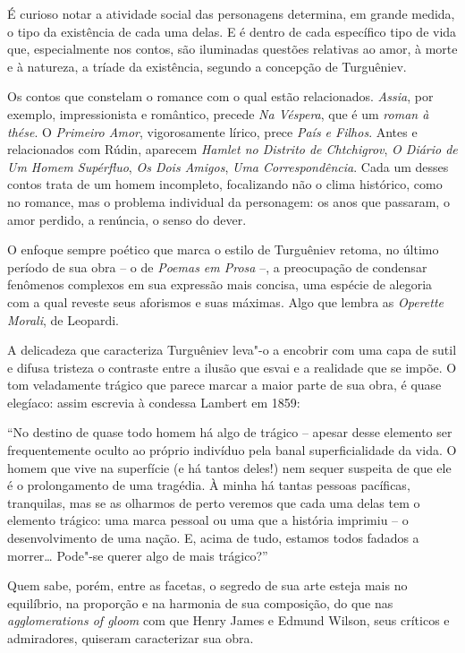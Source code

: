 É curioso notar a atividade social das personagens determina, em grande
medida, o tipo da existência de cada uma delas. E é dentro de cada
específico tipo de vida que, especialmente nos contos, são iluminadas
questões relativas ao amor, à morte e à natureza, a tríade da
existência, segundo a concepção de Turguêniev.

Os contos que constelam o romance com o qual estão relacionados.
\emph{Assia}, por exemplo, impressionista e romântico, precede \emph{Na
Véspera}, que é um \emph{roman à thése}. O \emph{Primeiro Amor},
vigorosamente lírico, prece \emph{País e Filhos}. Antes e relacionados
com Rúdin, aparecem \emph{Hamlet no Distrito de Chtchigrov}, \emph{O
Diário de Um Homem Supérfluo}, \emph{Os Dois Amigos}, \emph{Uma
Correspondência}. Cada um desses contos trata de um homem incompleto,
focalizando não o clima histórico, como no romance, mas o problema
individual da personagem: os anos que passaram, o amor perdido, a
renúncia, o senso do dever.

O enfoque sempre poético que marca o estilo de Turguêniev retoma, no
último período de sua obra -- o de \emph{Poemas em Prosa} --, a
preocupação de condensar fenômenos complexos em sua expressão mais
concisa, uma espécie de alegoria com a qual reveste seus aforismos e
suas máximas. Algo que lembra as \emph{Operette Morali}, de Leopardi.

A delicadeza que caracteriza Turguêniev leva"-o a encobrir com uma capa
de sutil e difusa tristeza o contraste entre a ilusão que esvai e a
realidade que se impõe. O tom veladamente trágico que parece marcar a
maior parte de sua obra, é quase elegíaco: assim escrevia à condessa
Lambert em 1859:

``No destino de quase todo homem há algo de trágico -- apesar desse
elemento ser frequentemente oculto ao próprio indivíduo pela banal
superficialidade da vida. O homem que vive na superfície (e há tantos
deles!) nem sequer suspeita de que ele é o prolongamento de uma
tragédia. À minha há tantas pessoas pacíficas, tranquilas, mas se as
olharmos de perto veremos que cada uma delas tem o elemento trágico: uma
marca pessoal ou uma que a história imprimiu -- o desenvolvimento de uma
nação. E, acima de tudo, estamos todos fadados a morrer\ldots{} Pode"-se
querer algo de mais trágico?''

Quem sabe, porém, entre as facetas, o segredo de sua arte esteja mais no
equilíbrio, na proporção e na harmonia de sua composição, do que nas
\emph{agglomerations of gloom} com que Henry James e Edmund Wilson, seus
críticos e admiradores, quiseram caracterizar sua obra.

